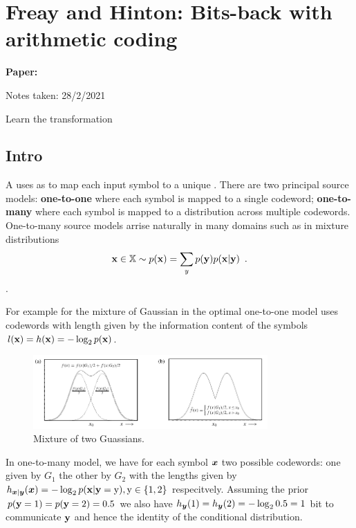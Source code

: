 \clearpage

\section{Freay and Hinton: Bits-back with arithmetic coding}\label{sec:arithmeticbitsback}

\begin{notebox}
\textbf{Paper: } 

\hfill Notes taken: 28/2/2021 
\end{notebox}

\begin{notebox}
\tldr Learn the transformation 
\end{notebox}

\subsection{Intro}

A  uses as  to map each input symbol to a unique .
There are two principal source models:
\textbf{one-to-one} where each symbol is mapped to a single codeword;
\textbf{one-to-many} where each symbol is mapped to a distribution across multiple codewords.
One-to-many source models arrise naturally in many domains such as in mixture distributions
\begin{align}
{\mathbf{x}} \in {\mathbb{X}} \sim p({\mathbf{x}}) = \sum_y p({\mathbf{y}}) p({\mathbf{x}} \vert {\mathbf{y}}) \enspace .
\end{align}.

For example for the mixture of Gaussian in  the optimal one-to-one model uses codewords with length given by the information content of the symbols $l({\mathbf{x}}) = h({\mathbf{x}}) = -\log_2 p({\mathbf{x}})$.

\begin{figure}[h]
\centering
\includegraphics[width=0.8\textwidth]{Pics/Frey1997.png}
\caption{Mixture of two Guassians.}
\label{fig:Frey1997}
\end{figure}

In one-to-many model, we have for each symbol ${\bm{x}}$ two possible codewords: one given by $G_1$ the other by $G_2$ with the lengths given by $h_{{\bm{x}}|{\bm{y}}}({\bm{x}}) = -\log_2 p({\mathbf{x}} | {\mathbf{y}} = {\textnormal{y}}), {\textnormal{y}} \in \{1, 2\}$ respecitvely.
Assuming the prior $p({\mathbf{y}} = 1) = p({\mathbf{y}} = 2) = 0.5$ we also have $h_{{\bm{y}}}(1) = h_{{\bm{y}}}(2) = - \log_2 0.5 = 1$ bit to communicate ${\mathbf{y}}$ and hence the identity of the conditional distribution.

